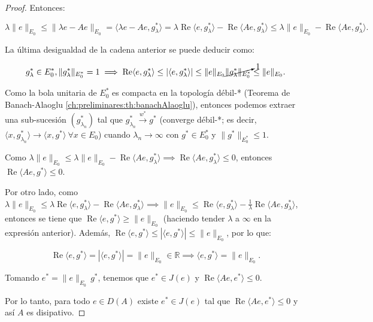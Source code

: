 \begin{proof}
    Entonces:

    \[\lambda \lVert e \rVert_{E_0} \leq \lVert \lambda e - Ae \rVert_{E_0} = \langle \lambda e - Ae, g_\lambda^* \rangle = \lambda \operatorname{Re}\langle e, g_\lambda^* \rangle - \operatorname{Re}\langle Ae, g_\lambda^* \rangle \leq \lambda \lVert e \rVert_{E_0} - \operatorname{Re}\langle Ae, g_\lambda^* \rangle.\]

    La última desigualdad de la cadena anterior se puede deducir como:

    \[g_\lambda^* \in E_0^*, \lVert g_\lambda^* \rVert_{E_0^*} = 1 \implies \operatorname{Re}\langle e, g_\lambda^* \rangle \leq |\langle e, g_\lambda^* \rangle| \leq \lVert e \rVert_{E_0} \cancelto{1}{\lVert g_\lambda^* \rVert_{E_0^*}} \leq \lVert e \rVert_{E_0}.\]

    Como la bola unitaria de $E_0^*$ es compacta en la topología débil-* (Teorema de Banach-Alaoglu \ref{ch:preliminares:th:banachAlaoglu}), entonces podemos extraer una sub-sucesión $(g_{\lambda_n}^*)$ tal que $g_{\lambda_n}^* \xrightarrow{w^*} g^*$ (converge débil-*; es decir, $\langle x, g_{\lambda_n}^* \rangle \rightarrow \langle x, g^* \rangle \ \forall x \in E_0$) cuando $\lambda_n \rightarrow \infty$ con $g^* \in E_0^*$ y $\lVert g^* \rVert_{E_0^*} \leq 1$.

    Como $\lambda \lVert e \rVert_{E_0} \leq \lambda \lVert e \rVert_{E_0} - \operatorname{Re} \langle Ae, g_\lambda^* \rangle \implies \operatorname{Re}\langle Ae, g_\lambda^* \rangle \leq 0$, entonces $\operatorname{Re}\langle Ae, g^* \rangle \leq 0$. 

    Por otro lado, como $\lambda \lVert e \rVert_{E_0} \leq \lambda \operatorname{Re}\langle e, g_\lambda^* \rangle - \operatorname{Re} \langle Ae, g_\lambda^* \rangle \implies \lVert e \rVert_{E_0} \leq \operatorname{Re}\langle e, g_\lambda^* \rangle - \frac{1}{\lambda}\operatorname{Re} \langle Ae, g_\lambda^* \rangle$, entonces se tiene que $\operatorname{Re}\langle e, g^* \rangle \geq \lVert e \rVert_{E_0}$ (haciendo tender $\lambda$ a $\infty$ en la expresión anterior). Además, $\operatorname{Re}\langle e, g^* \rangle \leq | \langle e, g^* \rangle | \leq \lVert e \rVert_{E_0}$, por lo que:

    \[\operatorname{Re}\langle e, g^* \rangle = |\langle e, g^* \rangle | = \lVert e \rVert_{E_0} \in \mathbb{R} \implies \langle e, g^* \rangle = \lVert e \rVert_{E_0}.\]

    Tomando $e^* = \lVert e \rVert_{E_0} \, g^*$, tenemos que $e^* \in J(e)$ y $\operatorname{Re}\langle Ae, e^* \rangle \leq 0.$

    Por lo tanto, para todo $e \in D(A)$ existe $e^* \in J(e)$ tal que $\operatorname{Re}\langle Ae, e^* \rangle \leq 0$ y así $A$ es disipativo.
\end{proof}

